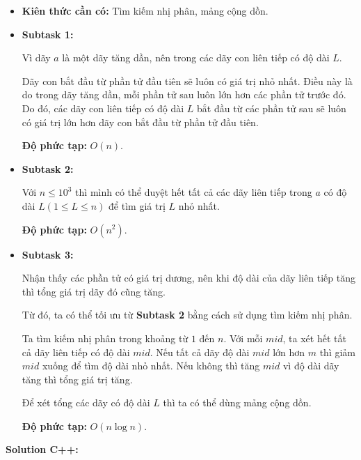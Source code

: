 \documentclass[12pt]{scrartcl}  %
\begin{document}
\begin{itemize}
    \item \textbf{Kiên thức cần có:} Tìm kiếm nhị phân, mảng cộng dồn.
\end{itemize}
\begin{itemize}
    \item \textbf{Subtask 1:}
        
    Vì dãy $a$ là một dãy tăng dần, nên trong các dãy con liên tiếp có độ dài $L$.
        
    Dãy con bắt đầu từ phần tử đầu tiên sẽ luôn có giá trị nhỏ nhất. Điều này là do trong dãy tăng dần,
    mỗi phần tử sau luôn lớn hơn các phần tử trước đó. Do đó, các dãy con liên tiếp có độ dài $L$
    bắt đầu từ các phần tử sau sẽ luôn có giá trị lớn hơn dãy con bắt đầu từ phần tử đầu tiên.

    \textbf{Độ phức tạp:} $O(n)$.
    \item \textbf{Subtask 2:}

    Với $n \leq 10^3$ thì mình có thể duyệt hết tất cả các dãy liên tiếp trong $a$ có độ
    dài $L(1 \leq L \leq n)$ để tìm giá trị $L$ nhỏ nhất.

    \textbf{Độ phức tạp:} $O(n^2)$.

    \item \textbf{Subtask 3:}
    
    Nhận thấy các phần tử có giá trị dương, nên khi độ dài của dãy liên tiếp
    tăng thì tổng giá trị dãy đó cũng tăng.

    Từ đó, ta có thể tối ưu từ \textbf{Subtask 2} bằng cách sử dụng tìm kiếm nhị phân.

    Ta tìm kiếm nhị phân trong khoảng từ $1$ đến $n$. Với mỗi $mid$, ta xét hết tất cả dãy
    liên tiếp có độ dài $mid$. Nếu tất cả dãy độ dài $mid$ lớn hơn $m$ thì giảm $mid$ xuống để tìm độ dài
    nhỏ nhất. Nếu không thì tăng $mid$ vì độ dài dãy tăng thì tổng giá trị tăng.

    Để xét tổng các dãy có độ dài $L$ thì ta có thể dùng mảng cộng dồn.

    \textbf{Độ phức tạp:} $O(n \log n)$.
    
\end{itemize}

\textbf{Solution C++:}
\end{document}
